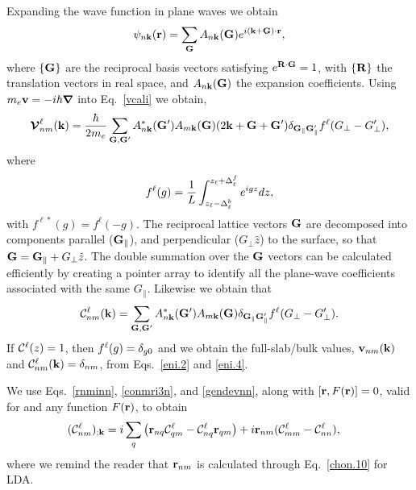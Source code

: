 \documentclass[floatfix,prb,aps,superscriptaddress,11pt,preprint,letterpaper]{revtex4}
\def\chon{black}
\begin{document}
Expanding the wave function in plane waves we obtain
\begin{align}\label{eni.1}
\psi_{n\mathbf{k}}(\mathbf{r})=\sum_{\mathbf{G}} A_{n\mathbf{k}}(\mathbf{G})e^{i(\mathbf{k}+\mathbf{G})\cdot\mathbf{r}}
,
\end{align}
where $\{\mathbf{G}\}$ are the reciprocal basis vectors satisfying
$e^{\mathbf{R}\cdot\mathbf{G}}=1$, with $\{\mathbf{R}\}$ the translation vectors in real
space, and $A_{n\mathbf{k}}(\mathbf{G})$ {\color{\chon} the} expansion coefficients. Using
$m_e\mathbf{v}=-i\hbar\boldsymbol{\nabla}$ into 
Eq.~\eqref{vcali}
we obtain,\cite{mendozaPRB06}
\begin{align}\label{eni.2}
\boldsymbol{\mathcal{\cal V}}^\ell_{nm}(\mathbf{k})=
\frac{\hbar}{2m_e}
\sum_{\mathbf{G},\mathbf{G}'} A^*_{n\mathbf{k}}(\mathbf{G}')  A_{m\mathbf{k}}(\mathbf{G})
(2\mathbf{k}+\mathbf{G}+\mathbf{G}')
\delta_{\mathbf{G}_\parallel \mathbf{G}'_\parallel}  
f^\ell(G_\perp-G'_\perp)
,
\end{align}   
where
\begin{align}\label{vnl.9}
f^\ell(g)=\frac{1}{L}\int_{z_\ell-\Delta^b_\ell}^{z_\ell+\Delta^f_\ell} e^{igz}dz  
 ,
\end{align}
with $f^{\ell*}(g)=f^\ell(-g)$. 
{\color{\chon} The} reciprocal lattice vectors $\mathbf{G}$ are 
decomposed into components
{\color{\chon} parallel ($\mathbf{G}_\parallel$), and perpendicular ($G_\perp \hat z$)} 
to the surface, so
that $\mathbf{G} = \mathbf{G}_\parallel + G_\perp\hat z$.
The double summation over the $\mathbf{G}$ vectors can be 
{\color{\chon} calculated efficiently} by  
creating a pointer array to identify all the plane-wave coefficients  
associated with the same $G_\parallel$.  
Likewise we obtain that
\begin{align}\label{eni.4}
{\mathbf{\cal C}}^\ell_{nm}(\mathbf{k})=
\sum_{\mathbf{G},\mathbf{G}'} A^*_{n\mathbf{k}}(\mathbf{G}')  A_{m\mathbf{k}}(\mathbf{G})
\delta_{\mathbf{G}_\parallel \mathbf{G}'_\parallel} 
f^\ell(G_\perp-G'_\perp)
.
\end{align}  
If ${\mathbf{\cal C}}^\ell(z)=1$, {\color{\chon} then $f^\ell(g)=\delta_{g0}$ and we 
obtain the full-slab/bulk values, 
$\mathbf{v}_{nm}(\mathbf{k})$ and ${\mathbf{\cal C}}^\ell_{nm}(\mathbf{k})=\delta_{nm}$,
from Eqs.~\eqref{eni.2} and \eqref{eni.4}}.

We use Eqs.~\eqref{rnminn}, \eqref{conmri3n}, and \eqref{gendevnn},
along with $[\mathbf{r},F(\mathbf{r})]=0$, valid for 
and any function $F(\mathbf{r})$, 
{\color{\chon} to }obtain
\begin{align} 
({\mathbf{\cal C}}^\ell_{nm})_{;\mathbf{k}}
&=
i
\sum_{q} 
 \left(\mathbf{r}_{nq}
{\mathbf{\cal C}}^\ell_{qm}
-
{\mathbf{\cal C}}^\ell_{nq}
\mathbf{r}_{qm}
\right) 
+i\mathbf{r}_{nm}({\mathbf{\cal C}}^\ell_{mm}-{\mathbf{\cal C}}^\ell_{nn}) 
,
\end{align} 
where we remind the reader that $\mathbf{r}_{nm}$ 
{\color{\chon} is} calculated through
Eq.~\eqref{chon.10} for LDA. 
\end{document}
